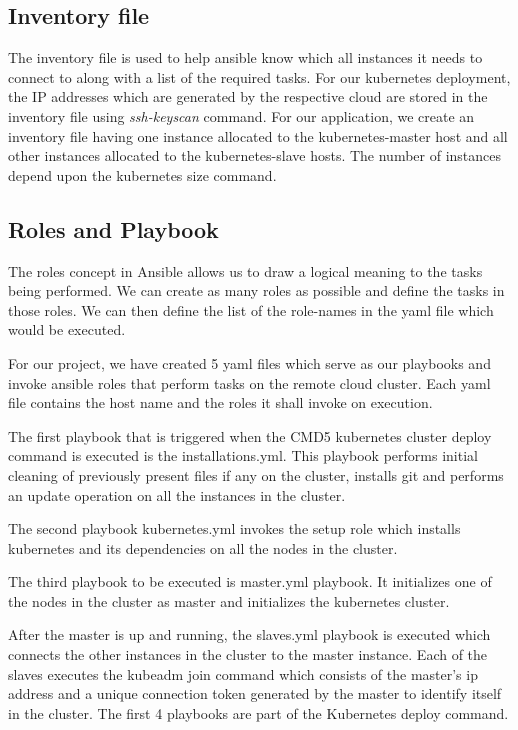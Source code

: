 \documentclass[9pt,twocolumn,twoside]{../../styles/osajnl}
\begin{document}
{\subsection{Inventory file}
The inventory file is used to help ansible know which all instances it
needs to connect to along with a list of the required tasks. For our
kubernetes deployment, the IP addresses which are generated by the
respective cloud are stored in the inventory file using
\emph{ssh-keyscan} command. For our application, we create an
inventory file having one instance allocated to the kubernetes-master
host and all other instances allocated to the kubernetes-slave
hosts. The number of instances depend upon the kubernetes size
command.

\subsection{Roles and Playbook}
The roles concept in Ansible allows us to draw a logical meaning to the
tasks being performed. We can create as many roles as possible and
define the tasks in those roles. We can then define the list of the
role-names in the yaml file which would be executed.\newline

\noindent
For our project, we have created 5 yaml files which serve as our
playbooks and invoke ansible roles that perform tasks on the remote
cloud cluster. Each yaml file contains the host name and the roles it
shall invoke on execution.\newline

\noindent
The first playbook that is triggered when the CMD5 kubernetes cluster
deploy command is executed is the installations.yml. This playbook
performs initial cleaning of previously present files if any on the
cluster, installs git and performs an update operation on all the
instances in the cluster.\newline

\noindent
The second playbook kubernetes.yml invokes the setup role which
installs kubernetes and its dependencies on all the nodes in the
cluster. \newline

\noindent
The third playbook to be executed is master.yml playbook. It
initializes one of the nodes in the cluster as master and initializes
the kubernetes cluster.\newline

\noindent
After the master is up and running, the slaves.yml playbook is
executed which connects the other instances in the cluster to the
master instance. Each of the slaves executes the kubeadm join command
which consists of the master's ip address and a unique connection
token generated by the master to identify itself in the cluster. The
first 4 playbooks are part of the Kubernetes deploy command.\newline

}
\end{document}

